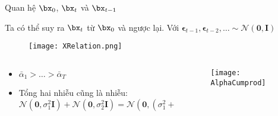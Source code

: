 \begin{frame}{Quan hệ $\bx_{0}$, $\bx_t$ và $\bx_{t - 1}$}
	
	Ta có thể suy ra $\bx_t$ từ $\bx_0$ và ngược lại. Với $ \boldsymbol{\epsilon}_{t-1}, \boldsymbol{\epsilon}_{t-2}, \dots \sim \mathcal{N}(\mathbf{0}, \mathbf{I})$
	\vspace{-10pt}
	
	\begin{figure}
		\centering
		\texttt{[image: XRelation.png]}
	\end{figure}
	\begin{columns}
		\begin{column}{0.5\textwidth}
			\begin{itemize}
				\item $\bar{\alpha}_1 > \dots > \bar{\alpha}_T$
				\item Tổng hai nhiễu cũng là nhiễu:
				\footnotesize
				$$
				\mathcal{N}(\mathbf{0}, \sigma_1^2\mathbf{I}) + 
				\mathcal{N}(\mathbf{0}, \sigma_2^2\mathbf{I})
				=\mathcal{N}(\mathbf{0}, (\sigma_1^2 + \sigma_2^2)\mathbf{I})
				$$
			\end{itemize}
		\end{column}
		\begin{column}{0.5\textwidth}
			
			\begin{figure}
				\centering
				\texttt{[image: AlphaCumprod]}
			\end{figure}
			
			
		\end{column}
	\end{columns}
	
\end{frame}


